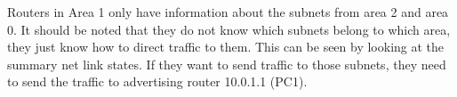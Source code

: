 
Routers in Area 1 only have information about the subnets from area 2 and area 0. It should be noted that they do not know which subnets belong to which area, they just know how to direct traffic to them. This can be seen by looking at the summary net link states. If they want to send traffic to those subnets, they need to send the traffic to advertising router 10.0.1.1 (PC1).